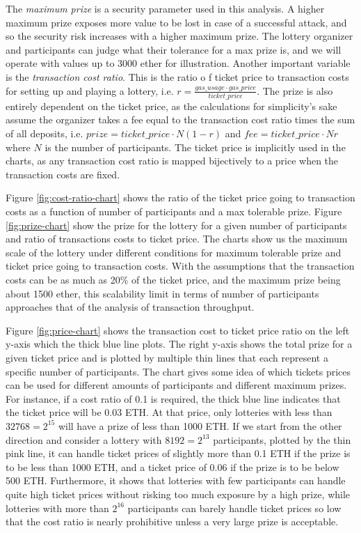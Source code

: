 The \emph{maximum prize} is a security parameter used in this analysis. A higher maximum prize exposes more value to be lost in case of a successful attack, and so the security risk increases with a higher maximum prize. The lottery organizer and participants can judge what their tolerance for a max prize is, and we will operate with values up to 3000 ether for illustration. Another important variable is the \emph{transaction cost ratio}. This is the ratio o  f ticket price to transaction costs for setting up and playing a lottery, i.e. $r=\frac{gas\_usage \cdot gas\_price}{ticket\_price}$. The prize is also entirely dependent on the ticket price, as the calculations for simplicity's sake assume the organizer takes a fee equal to the transaction cost ratio times the sum of all deposits, i.e. $prize=ticket\_price \cdot N(1-r)$ and $fee=ticket\_price \cdot Nr$ where $N$ is the number of participants. The ticket price is implicitly used in the charts, as any transaction cost ratio is mapped bijectively to a price when the transaction costs are fixed.

Figure \ref{fig:cost-ratio-chart} shows the ratio of the ticket price going to transaction costs as a function of number of participants and a max tolerable prize. Figure \ref{fig:prize-chart} show the prize for the lottery for a given number of participants and ratio of transactions costs to ticket price.
The charts show us the maximum scale of the lottery under different conditions for maximum tolerable prize and ticket price going to transaction costs. With the assumptions that the transaction costs can be as much as 20\% of the ticket price, and the maximum prize being about 1500 ether, this scalability limit in terms of number of participants approaches that of the analysis of transaction throughput.

Figure \ref{fig:price-chart} shows the transaction cost to ticket price ratio on the left y-axis which the thick blue line plots. The right y-axis shows the total prize for a given ticket price and is plotted by multiple thin lines that each represent a specific number of participants. The chart gives some idea of which tickets prices can be used for different amounts of participants and different maximum prizes. For instance, if a cost ratio of 0.1 is required, the thick blue line indicates that the ticket price will be 0.03 ETH. At that price, only lotteries with less than $32768=2^{15}$ will have a prize of less than 1000 ETH. If we start from the other direction and consider a lottery with $8192=2^{13}$ participants, plotted by the thin pink line, it can handle ticket prices of slightly more than 0.1 ETH if the prize is to be less than 1000 ETH, and a ticket price of 0.06 if the prize is to be below 500 ETH. Furthermore, it shows that lotteries with few participants can handle quite high ticket prices without risking too much exposure by a high prize, while lotteries with more than $2^{16}$ participants can barely handle ticket prices so low that the cost ratio is nearly prohibitive unless a very large prize is acceptable.

